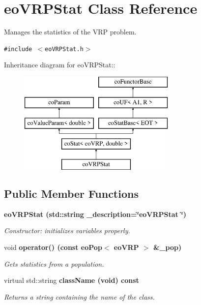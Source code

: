 \section{eo\-VRPStat Class Reference}
\label{classeo_v_r_p_stat}
Manages the statistics of the VRP problem.  


{\tt \#include $<$eo\-VRPStat.h$>$}

Inheritance diagram for eo\-VRPStat::\begin{figure}[H]
\begin{center}
\leavevmode
\includegraphics[height=5cm]{classeo_v_r_p_stat}
\end{center}
\end{figure}
\subsection*{Public Member Functions}
\begin{CompactItemize}
\item 
\bf{eo\-VRPStat} (std::string \_\-description=\char`\"{}eo\-VRPStat \char`\"{})
\begin{CompactList}\small\item\em Constructor: initializes variables properly. \item\end{CompactList}\item 
void \bf{operator()} (const \bf{eo\-Pop}$<$ \bf{eo\-VRP} $>$ \&\_\-pop)
\begin{CompactList}\small\item\em Gets statistics from a population. \item\end{CompactList}\item 
virtual std::string \bf{class\-Name} (void) const 
\begin{CompactList}\small\item\em Returns a string containing the name of the class. \item\end{CompactList}\end{CompactItemize}


